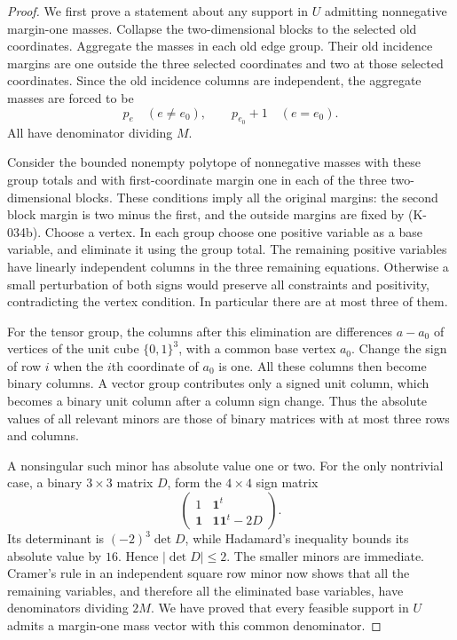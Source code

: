 \begin{proof}
We first prove a statement about any support in $U$ admitting
nonnegative margin-one masses.  Collapse the two-dimensional blocks
to the selected old coordinates.  Aggregate the masses in each old
edge group.  Their old incidence margins are one outside the three
selected coordinates and two at those selected coordinates.  Since
the old incidence columns are independent, the aggregate masses
are forced to be
\[
             p_e\quad(e\ne e_0),\qquad p_{e_0}+1\quad(e=e_0).
                                                        \tag{K-034b}
\]
All have denominator dividing $M$.

Consider the bounded nonempty polytope of nonnegative masses with
these group totals and with first-coordinate margin one in each
of the three two-dimensional blocks.  These conditions imply all
the original margins: the second block margin is two minus the
first, and the outside margins are fixed by (K-034b).  Choose a
vertex.  In each group choose one positive variable as a base
variable, and eliminate it using the group total.  The remaining
positive variables have linearly independent columns in the three
remaining equations.  Otherwise a small perturbation of both signs
would preserve all constraints and positivity, contradicting the
vertex condition.  In particular there are at most three of them.

For the tensor group, the columns after this elimination are
differences $a-a_0$ of vertices of the unit cube $\{0,1\}^3$, with
a common base vertex $a_0$.  Change the sign of row $i$ when the
$i$th coordinate of $a_0$ is one.  All these columns then become
binary columns.  A vector group contributes only a signed unit
column, which becomes a binary unit column after a column sign
change.  Thus the absolute values of all relevant minors are
those of binary matrices with at most three rows and columns.

A nonsingular such minor has absolute value one or two.  For the
only nontrivial case, a binary $3\times3$ matrix $D$, form the
$4\times4$ sign matrix
\[
                 \begin{pmatrix}1&\mathbf1^t\\
                       \mathbf1&\mathbf1\mathbf1^t-2D
                       \end{pmatrix}.
\]
Its determinant is $(-2)^3\det D$, while Hadamard's inequality
bounds its absolute value by $16$.  Hence $|\det D|\le2$.
The smaller minors are immediate.  Cramer's rule in an independent
square row minor now shows that all the remaining variables,
and therefore all the eliminated base variables, have denominators
dividing $2M$.  We have proved that every feasible support in $U$
admits a margin-one mass vector with this common denominator.


\end{proof}
